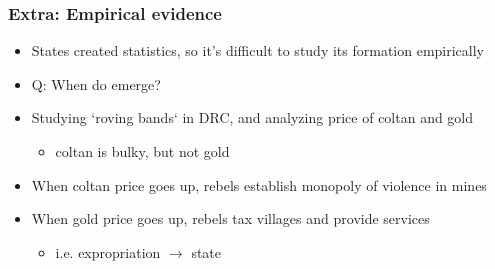 \documentclass[aspectratio=43, handout]{beamer}
\begin{document}
\begin{frame}
\frametitle{Extra: Empirical evidence}
\centering

\begin{minipage}{0.65\textwidth}\centering
  \begin{itemize}
    \item States created statistics, so it's difficult to study its formation empirically
    \item Q: When do  emerge?
    \item<2-> Studying `roving bands` in DRC, and analyzing price of coltan and gold
    \begin{itemize}
      \item coltan is bulky, but not gold
    \end{itemize}
    \item<3-> When coltan price goes up, rebels establish monopoly of violence in mines
    \item<3-> When gold price goes up, rebels tax villages and provide services
    \begin{itemize}
      \item i.e. expropriation $\rightarrow$ state
    \end{itemize}
  \end{itemize}
\end{minipage}\hfill
\begin{minipage}{0.34\textwidth}\centering

\end{minipage}
\end{frame}
\end{document}
